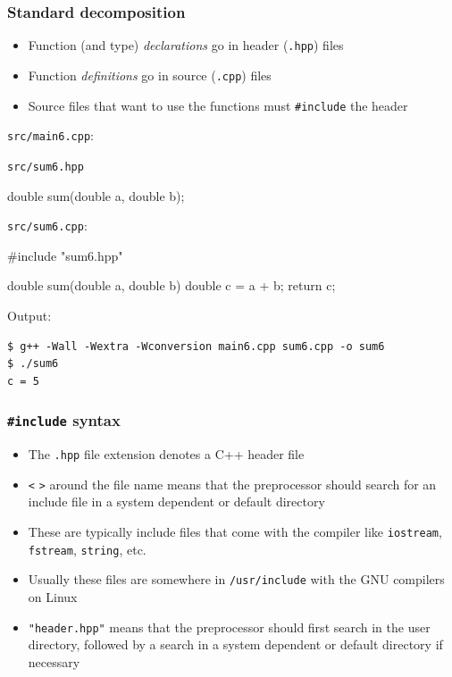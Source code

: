 \documentclass[12pt,letterpaper,twoside]{article}
\begin{document}
\subsubsection{Standard decomposition}
\begin{itemize}
\item
  Function (and type) \emph{declarations} go in header (\texttt{.hpp})
  files
\item
  Function \emph{definitions} go in source (\texttt{.cpp}) files
\item
  Source files that want to use the functions must \texttt{\#include}
  the header
\end{itemize}

\texttt{src/main6.cpp}:

\begin{cpp}
\begin{Highlighting}[]

\end{Highlighting}
\end{cpp}

\texttt{src/sum6.hpp}

\begin{cpp}
double sum(double a, double b);
\end{cpp}

\texttt{src/sum6.cpp}:

\begin{cpp}
#include "sum6.hpp"

double sum(double a, double b) {
  double c = a + b;
  return c;
}
\end{cpp}

Output:

\begin{verbatim}
$ g++ -Wall -Wextra -Wconversion main6.cpp sum6.cpp -o sum6
$ ./sum6
c = 5
\end{verbatim}

\subsubsection{\texorpdfstring{\texttt{\#include} syntax}{\#include syntax}}
\begin{itemize}
\item
  The \texttt{.hpp} file extension denotes a C++ header file
\item
  \texttt{\textless{}} \texttt{\textgreater{}} around the file name
  means that the preprocessor should search for an include file in a
  system dependent or default directory
\item
  These are typically include files that come with the compiler like
  \texttt{iostream}, \texttt{fstream}, \texttt{string}, etc.
\item
  Usually these files are somewhere in \texttt{/usr/include} with the
  GNU compilers on Linux
\item
  \texttt{"header.hpp"} means that the preprocessor should first search
  in the user directory, followed by a search in a system dependent or
  default directory if necessary
\end{itemize}
\end{document}
